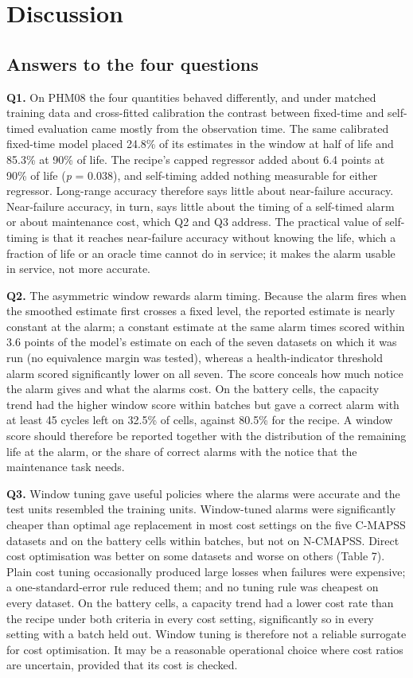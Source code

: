\documentclass[a4paper,fleqn,doubleblind]{cas-dc}
\begin{document}
\section{Discussion}\label{sec:7}

\subsection{Answers to the four questions}

\textbf{Q1.} On PHM08 the four quantities behaved differently, and under matched training data and cross-fitted calibration the contrast between fixed-time and self-timed evaluation came mostly from the observation time. The same calibrated fixed-time model placed 24.8\% of its estimates in the window at half of life and 85.3\% at 90\% of life. The recipe's capped regressor added about 6.4 points at 90\% of life (\textit{p} = 0.038), and self-timing added nothing measurable for either regressor. Long-range accuracy therefore says little about near-failure accuracy. Near-failure accuracy, in turn, says little about the timing of a self-timed alarm or about maintenance cost, which Q2 and Q3 address. The practical value of self-timing is that it reaches near-failure accuracy without knowing the life, which a fraction of life or an oracle time cannot do in service; it makes the alarm usable in service, not more accurate.

\textbf{Q2.} The asymmetric window rewards alarm timing. Because the alarm fires when the smoothed estimate first crosses a fixed level, the reported estimate is nearly constant at the alarm; a constant estimate at the same alarm times scored within 3.6 points of the model's estimate on each of the seven datasets on which it was run (no equivalence margin was tested), whereas a health-indicator threshold alarm scored significantly lower on all seven. The score conceals how much notice the alarm gives and what the alarms cost. On the battery cells, the capacity trend had the higher window score within batches but gave a correct alarm with at least 45 cycles left on 32.5\% of cells, against 80.5\% for the recipe. A window score should therefore be reported together with the distribution of the remaining life at the alarm, or the share of correct alarms with the notice that the maintenance task needs.

\textbf{Q3.} Window tuning gave useful policies where the alarms were accurate and the test units resembled the training units. Window-tuned alarms were significantly cheaper than optimal age replacement in most cost settings on the five C-MAPSS datasets and on the battery cells within batches, but not on N-CMAPSS. Direct cost optimisation was better on some datasets and worse on others (Table 7). Plain cost tuning occasionally produced large losses when failures were expensive; a one-standard-error rule reduced them; and no tuning rule was cheapest on every dataset. On the battery cells, a capacity trend had a lower cost rate than the recipe under both criteria in every cost setting, significantly so in every setting with a batch held out. Window tuning is therefore not a reliable surrogate for cost optimisation. It may be a reasonable operational choice where cost ratios are uncertain, provided that its cost is checked.
\end{document}
